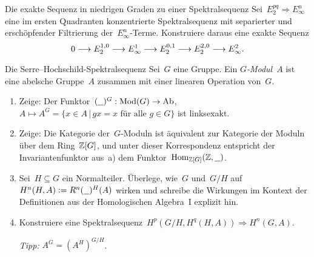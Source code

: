 \documentclass{uebblatt}
\begin{document}
\begin{aufgabe}{Die exakte Sequenz in niedrigen Graden zu einer
Spektralsequenz}
Sei~$E_2^{pq} \Rightarrow E_\infty^n$ eine im ersten Quadranten konzentrierte
Spektralsequenz mit separierter und erschöpfender Filtrierung
der~$E_\infty^n$-Terme. Konstruiere daraus eine exakte Sequenz
\[ 0 \longrightarrow E_2^{1,0} \longrightarrow E^1_\infty \longrightarrow E_2^{0,1} \longrightarrow E_2^{2,0} \longrightarrow
E^2_\infty. \]
\end{aufgabe}
\vspace{-1.5em}

\begin{aufgabe}{Die Serre--Hochschild-Spektralsequenz}
Sei~$G$ eine Gruppe. Ein \emph{$G$-Modul}~$A$ ist eine abelsche Gruppe~$A$
zusammen mit einer linearen Operation von~$G$.
\begin{enumerate}
\item Zeige: Der Funktor~$(\underline{\ \ })^G : \mathrm{Mod}(G) \to \mathrm{Ab}$, $A \mapsto A^G = \{ x \in A \,|\,
\text{$gx = x$ für alle $g \in G$} \}$ ist linksexakt.
\item Zeige: Die Kategorie der~$G$-Moduln ist äquivalent zur Kategorie der
Moduln über dem Ring~$\mathbb{Z}[G]$, und unter dieser Korrespondenz entspricht der
Invariantenfunktor aus~a) dem Funktor~$\mathrm{Hom}_{\mathbb{Z}[G]}(\mathbb{Z}, \underline{\ \ })$.
\item Sei~$H \subseteq G$ ein Normalteiler. Überlege, wie~$G$ und~$G/H$ auf~$H^n(H,A)
\vcentcolon= R^n(\underline{\ \ })^H(A)$ wirken und schreibe die Wirkungen im Kontext
der Definitionen aus der Homologischen Algebra~I explizit hin.
\item Konstruiere eine Spektralsequenz~$H^p(G/H, H^q(H,A))
\Rightarrow H^n(G,A)$.
{\tiny\emph{Tipp:} $A^G = (A^H)^{G/H}$.\par}
\end{enumerate}
\end{aufgabe}
\end{document}
